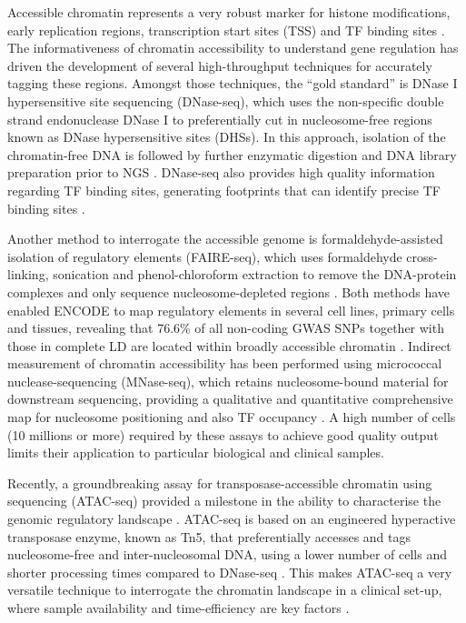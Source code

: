 Accessible chromatin represents a very robust marker for histone modifications, early replication regions, transcription start sites (TSS) and TF binding sites \parencite{ENCODE2007}. The informativeness of chromatin accessibility to understand gene regulation has driven the development of several high-throughput techniques for accurately tagging these regions. Amongst those techniques, the ``gold standard'' is DNase I hypersensitive site sequencing (DNase-seq), which uses the non-specific double strand endonuclease DNase I to preferentially cut in nucleosome-free regions known as DNase hypersensitive sites (DHSs). In this approach, isolation of the chromatin-free DNA is followed by further enzymatic digestion and DNA library preparation prior to NGS \parencite{John2013}. DNase-seq also provides high quality information regarding TF binding sites, generating footprints that can identify precise TF binding sites  \parencite{Hesselberth2009,Boyle2010}. 

Another method to interrogate the accessible genome is formaldehyde-assisted isolation of regulatory elements (FAIRE-seq), which uses formaldehyde cross-linking, sonication and phenol-chloroform extraction to remove the DNA-protein complexes and only sequence nucleosome-depleted regions \parencite{Giresi2006}. Both methods have enabled ENCODE to map regulatory elements in several cell lines, primary cells and tissues, revealing that 76.6\% of all non-coding GWAS SNPs together with those in complete LD are located within broadly accessible chromatin  \parencite{ENCODE2007,Buck2014,Gaulton2010, Maurano2012}. 
Indirect measurement of chromatin accessibility has been performed using micrococcal nuclease-sequencing (MNase-seq), which retains nucleosome-bound material for downstream sequencing, providing a qualitative and quantitative comprehensive map for nucleosome positioning and also TF occupancy \parencite{Axel1975,Ponts2010}. A high number of cells (10 millions or more) required by these assays to achieve good quality output limits their application to particular biological and clinical samples. 

Recently, a groundbreaking assay for transposase-accessible chromatin using sequencing (ATAC-seq) provided a milestone in the ability to characterise the genomic regulatory landscape \parencite{Buenrostro2013}. ATAC-seq is based on an engineered hyperactive transposase enzyme, known as Tn5, that preferentially accesses and tags nucleosome-free and inter-nucleosomal DNA, using a lower number of cells and shorter processing times compared to DNase-seq \parencite{Gradman2008, Adey2010}. This makes ATAC-seq a very versatile technique to interrogate the chromatin landscape in a clinical set-up, where sample availability and time-efficiency are key factors \parencite{Scharer2016,Qu2015,Qu2017}. 


